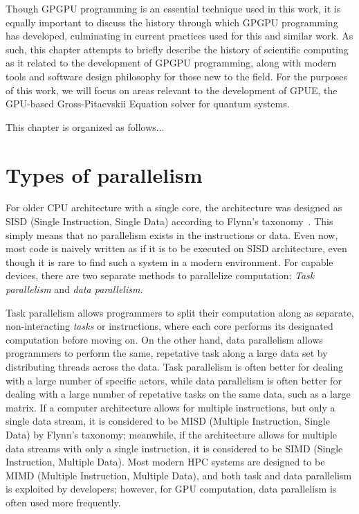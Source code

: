Though GPGPU programming is an essential technique used in this work, it is equally important to discuss the history through which GPGPU programming has developed, culminating in current practices used for this and similar work.
As such, this chapter attempts to briefly describe the history of scientific computing as it related to the development of GPGPU programming, along with modern tools and software design philosophy for those new to the field.
For the purposes of this work, we will focus on areas relevant to the development of GPUE, the GPU-based Gross-Pitaevskii Equation solver for quantum systems.

This chapter is organized as follows...

\section{Types of parallelism}

For older CPU architecture with a single core, the architecture was designed as SISD (Single Instruction, Single Data) according to Flynn's taxonomy~\cite{gurd1988}. 
This simply means that no parallelism exists in the instructions or data.
Even now, most code is naively written as if it is to be executed on SISD architecture, even though it is rare to find such a system in a modern environment.
For capable devices, there are two separate methods to parallelize computation: \textit{Task parallelism} and \textit{data parallelism}.

Task parallelism allows programmers to split their computation along as separate, non-interacting \textit{tasks} or instructions, where each core performs its designated computation before moving on.
On the other hand, data parallelism allows programmers to perform the same, repetative task along a large data set by distributing threads across the data.
Task parallelism is often better for dealing with a large number of specific actors, while data parallelism is often better for dealing with a large number of repetative tasks on the same data, such as a large matrix.
If a computer architecture allows for multiple instructions, but only a single data stream, it is considered to be MISD (Multiple Instruction, Single Data) by Flynn's taxonomy; meanwhile, if the architecture allows for multiple data streams with only a single instruction, it is considered to be SIMD (Single Instruction, Multiple Data).
Most modern HPC systems are designed to be MIMD (Multiple Instruction, Multiple Data), and both task and data parallelism is exploited by developers; however, for GPU computation, data parallelism is often used more frequently.

